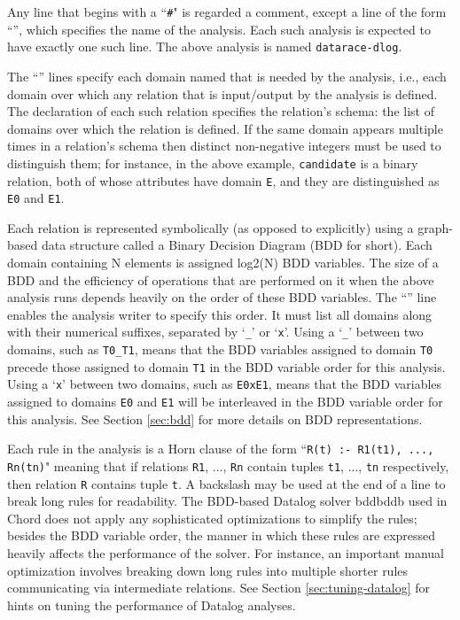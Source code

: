 Any line that begins with a ``{\tt \#}" is regarded a comment, except a
line of the form ``'', which specifies the name
 of the analysis.
Each such analysis is expected to have exactly one such line.
The above analysis is named {\tt datarace-dlog}.

The ``'' lines specify each domain named
 that is needed by the analysis, i.e., each domain over which
any relation that is input/output by the analysis is defined. 
The declaration of each such relation specifies the relation's schema:
the list of domains over which the relation is defined.
If the same domain appears multiple times in a relation's schema then
distinct non-negative integers must be used to distinguish them; for instance,
in the above example, {\tt candidate} is a binary relation, both of whose
attributes have domain {\tt E}, and they are distinguished as {\tt E0} and {\tt E1}.

Each relation is represented symbolically (as opposed to explicitly)
using a graph-based data structure called a Binary Decision Diagram (BDD for short).
Each domain containing N elements is assigned log2(N) BDD variables.
The size of a BDD and the efficiency of operations that are performed on it when the above
analysis runs depends heavily
on the order of these BDD variables.
The ``'' line enables the 
analysis writer to specify this order.
It must list all domains along with their numerical suffixes, separated
by `{\tt \_}' or `{\tt x}'.
Using a `{\tt \_}' between two domains, such as {\tt T0\_T1}, means that the BDD variables assigned
to domain {\tt T0} precede those assigned to domain {\tt T1} in the BDD variable
order for this analysis.
Using a `{\tt x}' between two domains, such as {\tt E0xE1}, means that the
BDD variables assigned to domains {\tt E0} and {\tt E1}
will be interleaved in the BDD variable order for this analysis.
See Section \ref{sec:bdd} for more details on BDD representations.

Each rule in the analysis is a Horn clause of the form
``{\tt R(t) :- R1(t1), ..., Rn(tn)}"
meaning that if relations {\tt R1}, ..., {\tt Rn} contain tuples {\tt t1}, ..., {\tt tn}
respectively, then relation {\tt R} contains tuple {\tt t}.
A backslash may be used at the end of a line to break long rules for readability.
The BDD-based Datalog solver bddbddb used in Chord does not apply any
sophisticated optimizations to simplify the rules; besides the BDD variable order,
the manner in which these rules are expressed heavily affects the performance of
the solver.  For instance, an important manual optimization involves breaking down
long rules into multiple shorter rules communicating via intermediate relations.
See Section \ref{sec:tuning-datalog} for hints on tuning the performance
of Datalog analyses.

